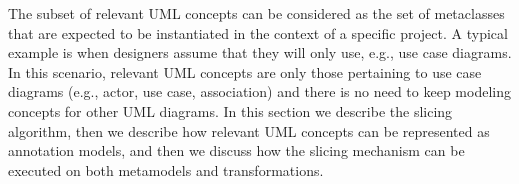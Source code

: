 The subset of relevant UML concepts can be considered as the set of metaclasses that are expected to be instantiated
in the context of a specific project. %
A typical example is when designers assume that they will only use, e.g., use case diagrams.
In this scenario, relevant UML concepts are only those pertaining to use case diagrams (e.g., actor, use case, association)
and there is no need to keep modeling concepts for other UML diagrams.
%
In this section we describe the slicing algorithm, then we describe how relevant UML concepts can be represented as annotation models, 
and then we discuss how the slicing mechanism can be executed on both metamodels and transformations.
%
\vspace{-.3cm}
